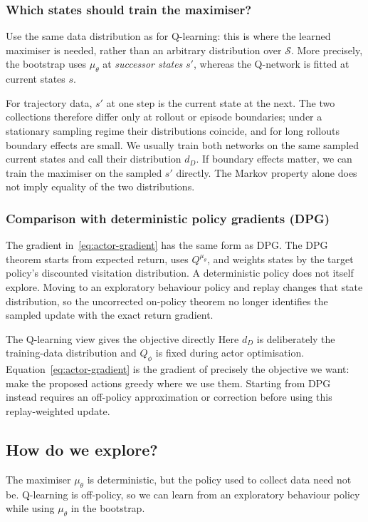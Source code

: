 \documentclass[11pt,a4paper]{article}
\begin{document}
\subsubsection{Which states should train the maximiser?}
Use the same data distribution as for Q-learning: this is where the learned
maximiser is needed, rather than an arbitrary distribution over $\mathcal S$.
More precisely, the bootstrap uses $\mu_\theta$ at \emph{successor states}
$s'$, whereas the Q-network is fitted at current states $s$.

For trajectory data, $s'$ at one step is the current state at the next.
The two collections therefore differ only at rollout or episode boundaries;
under a stationary sampling regime their distributions coincide, and for long
rollouts boundary effects are small. We usually train both networks on the
same sampled current states and call their distribution $d_D$. If boundary
effects matter, we can train the maximiser on the sampled $s'$ directly.
The Markov property alone does not imply equality of the two distributions.

\subsubsection{Comparison with deterministic policy gradients (DPG)}
The gradient in~\eqref{eq:actor-gradient} has the same form as DPG.
The {DPG theorem}
starts from expected return, uses $Q^{\mu_\theta}$, and weights states by the
target policy's discounted visitation distribution. A deterministic policy
does not itself explore. Moving to an exploratory behaviour policy and replay
changes that state distribution, so the uncorrected on-policy theorem no
longer identifies the sampled update with the exact return gradient.

\begin{idea}{The Q-learning view gives the objective directly}
Here $d_D$ is deliberately the training-data distribution and $Q_\phi$ is fixed
during actor optimisation. Equation~\eqref{eq:actor-gradient} is the gradient
of precisely the objective we want: make the proposed actions greedy where
we use them. Starting from DPG instead requires an off-policy approximation
or correction before using this replay-weighted update.
\end{idea}

\subsection{How do we explore?}
The maximiser $\mu_\theta$ is deterministic, but the policy used to collect
data need not be. Q-learning is off-policy, so we can learn from an
exploratory behaviour policy while using $\mu_\theta$ in the bootstrap.
\end{document}
